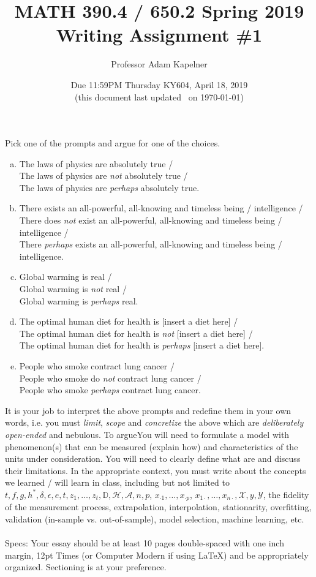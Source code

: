 \documentclass[12pt]{article}
\title{MATH 390.4 / 650.2 Spring 2019 \\ Writing Assignment \#1}
\author{Professor Adam Kapelner} %
\date{Due 11:59PM Thursday KY604, April 18, 2019 \\ \vspace{0.5cm} \small (this document last updated \currenttime~on \today)}
\begin{document}
\maketitle

\noindent Pick one of the prompts and argue for one of the choices. 

\begin{enumerate}[(a)]
\item The laws of physics are absolutely true / \\
The laws of physics are \textit{not} absolutely true / \\
The laws of physics are \textit{perhaps} absolutely true.
\item There exists an all-powerful, all-knowing and timeless being / intelligence / \\
There does \textit{not} exist an all-powerful, all-knowing and timeless being / intelligence / \\
There \textit{perhaps} exists an all-powerful, all-knowing and timeless being / intelligence.
\item Global warming is real / \\
Global warming is \textit{not} real / \\
Global warming is \textit{perhaps} real.
\item The optimal human diet for health is [insert a diet here] / \\
The optimal human diet for health is \textit{not} [insert a diet here] / \\
The optimal human diet for health is \textit{perhaps} [insert a diet here].
\item People who smoke contract lung cancer / \\
People who smoke do \textit{not} contract lung cancer / \\
People who smoke \textit{perhaps} contract lung cancer.
\end{enumerate}

\noindent It is your job to interpret the above prompts and redefine them in your own words, i.e. you must \textit{limit}, \textit{scope} and \textit{concretize} the above which are \textit{deliberately open-ended} and nebulous. To argueYou will need to formulate a model with phenomenon(s) that can be measured (explain how) and characteristics of the units under consideration. You will need to clearly define what  are and discuss their limitations. In the appropriate context, you must write about the concepts we learned / will learn in class, including but not limited to $t ,f, g, h^*, \delta, \epsilon, e, t, z_1, \ldots, z_t, \mathbb{D}, \mathcal{H}, \mathcal{A}, n, p$, $x_{\cdot 1}, \ldots, x_{\cdot p}$, $x_{1 \cdot}, \ldots, x_{n \cdot}, \mathcal{X}, y, \mathcal{Y}$, the fidelity of the measurement process, extrapolation, interpolation, stationarity, overfitting, validation (in-sample vs. out-of-sample), model selection, machine learning, etc. \\
~\\
Specs: Your essay should be at least 10 pages double-spaced with one inch margin, 12pt Times (or Computer Modern if using \LaTeX) and be appropriately organized. Sectioning is at your preference.

\end{document}
